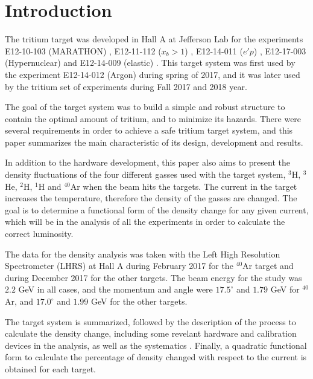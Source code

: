 \documentclass[final,5p,times,twocolumn,balance]{elsarticle}
\begin{document}

\section{Introduction}
\label{}

The tritium target was developed in Hall A at Jefferson Lab for the experiments E12-10-103 (MARATHON) \cite{marathon}, E12-11-112 ($x_{b}>1$) \cite{E12-11-112}, E12-14-011 ($e'p$) \cite{E12-14-011}, E12-17-003 (Hypernuclear) \cite{hypernuclear} and E12-14-009 (elastic) \cite{E12-14-009}. This target system was first used by the experiment E12-14-012 (Argon) \cite{E12-14-012} during spring of 2017, and it was later used by the tritium set of experiments during  Fall 2017 and  2018 year. 

The goal of the target system was to build a simple and robust structure to contain the optimal amount of tritium, and to minimize 
its hazards. There were several requirements in order to achieve a safe tritium target system, and this paper summarizes the main characteristic 
of its design, development and results. 

In addition to the hardware development, this paper also aims to present the density fluctuations of the four different gasses used 
with the target system, $^{3}$H, $^{3}$He, $^{2}$H, $^{1}$H and $^{40}$Ar when the beam hits the targets. The current in the target 
increases the temperature, therefore the density of the gasses are changed. The goal is to determine a functional form of the density 
change for any given current, which will be in the analysis of all the experiments in order to calculate the correct luminosity.

The data for the density analysis was taken with the Left High Resolution Spectrometer (LHRS) at Hall A during February 2017 
for the $^{40}$Ar target and during December 2017 for the other targets. The beam energy for the study was $2.2$ GeV in all 
cases, and the momentum and angle were $17.5 ^\circ $ and $1.79$ GeV for $^{40}$Ar, and $17.0 ^\circ $ and $1.99$ GeV for 
the other targets.

The target system is summarized, followed by the description of the process to calculate the density change, including 
some revelant hardware and calibration devices in the analysis, as well as the systematics . Finally, a quadratic functional form 
to calculate the percentage of density changed with respect to the current is  obtained for each target.
\end{document}
